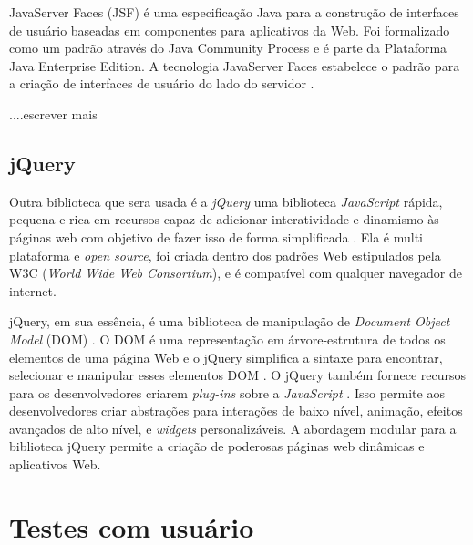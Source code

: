 JavaServer Faces (JSF) é uma especificação Java para a construção de interfaces de usuário baseadas em componentes para aplicativos da Web. Foi formalizado como um padrão através do Java Community Process e é parte da Plataforma Java Enterprise Edition. A tecnologia JavaServer Faces estabelece o padrão para a criação de interfaces de usuário do lado do servidor \cite{mann2013java}.

....escrever mais

\cite{burns2010javaserver}

\subsection{jQuery}

Outra biblioteca que sera usada é a \textit{jQuery} uma biblioteca \textit{JavaScript} rápida, pequena e rica em recursos capaz de adicionar interatividade e dinamismo às páginas web com objetivo de fazer isso de forma simplificada \cite{bibeault2008jquery}. Ela é multi plataforma e \textit{open source}\cite{bibeault2008jquery}, foi criada dentro dos padrões Web estipulados pela W3C  (\textit{World Wide Web Consortium}), e é compatível com qualquer navegador de internet.

jQuery, em sua essência, é uma biblioteca de manipulação de \textit{Document Object Model} (DOM) \cite{duckett2014web}. O DOM é uma representação em árvore-estrutura de todos os elementos de uma página Web e o jQuery simplifica a sintaxe para encontrar, selecionar e manipular esses elementos DOM \cite{bibeault2008jquery}. O jQuery também fornece recursos para os desenvolvedores criarem \textit{plug-ins }sobre a\textit{ JavaScript} \cite{duckett2014web}. Isso permite aos desenvolvedores criar abstrações para interações de baixo nível, animação, efeitos avançados de alto nível, e \textit{widgets} personalizáveis. A abordagem modular para a biblioteca jQuery permite a criação de poderosas páginas web dinâmicas e aplicativos Web.


\section{Testes com usuário}
\label{testes-usuarios-sec}

